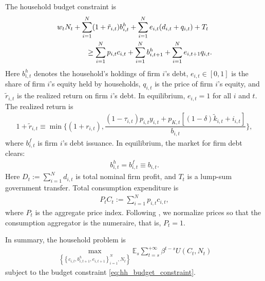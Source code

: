 \documentclass[12pt]{article}
\numberwithin{equation}{section}
\begin{document}
The household budget constraint is
\begin{align}\label{eq:hh_budget_constraint}
    &w_tN_t
    +\sum_{i=1}^{N}
        (1+\tilde{r}_{i,t})b^h_{i,t}
    +\sum_{i=1}^N e_{i,t} (d_{i,t} + q_{i,t}) + T_t \notag\\
    &\qquad \qquad\geq
    \sum_{i=1}^{N}
        p_{i,t}c_{i,t}
    +\sum_{i=1}^{N}b^h_{i,t+1} +\sum_{i=1}^N e_{i,t+1}  q_{i,t}.
\end{align}
Here $b^h_{i,t}$ denotes the household's holdings of firm $i$'s debt, $e_{i,t} \in [0,1]$ is the share of firm $i$'s equity held by households, $q_{i,t}$ is the price of firm $i$'s equity, and $\tilde{r}_{i,t}$ is the realized return on firm $i$'s debt. In equilibrium, $e_{i,t}=1$ for all $i$ and $t$. The realized return is
\begin{align}\label{eq:hh_realized_return}
    1+\tilde{r}_{i,t} \equiv
    \min\Bigg\{
        (1+r_{i,t}),
        \dfrac{(1-\tau_{i,t})p_{i,t} y_{i,t}
        +
        p_{K,t}
        \left[
            (1-\delta)\tilde{k}_{i,t}+i_{i,t}
        \right]}{b_{i,t}}
    \Bigg\},
\end{align}
where $b^f_{i,t}$ is firm $i$'s debt issuance. In equilibrium, the market for firm debt clears:
\begin{align}\label{eq:firm_debt_market_clearing}
    b^h_{i,t}=b^f_{i,t} \equiv b_{i,t}.
\end{align}
Here $D_t:= \sum_{i=1}^N d_{i,t}$ is total nominal firm profit, and $T_t$ is a lump-sum government transfer. Total consumption expenditure is
\begin{align*}
    P_tC_t
    :=
    \sum_{i=1}^{N}
        p_{i,t}c_{i,t},
\end{align*}
where $P_t$ is the aggregate price index. Following \cite{herskovicNetworksProductionAsset2018}, we normalize prices so that the consumption aggregator is the numeraire, that is, $P_t=1$.

In summary, the household problem is
\begin{align}\label{eq:hh_problem}
    \max_{\left\{\left\{c_{i,t}, b^h_{i,t+1}, e_{i,t+1}\right\}_{i=1}^{N}, N_t\right\}} \mathbb{E}_s \sum_{t=s}^{+\infty} \beta^{t-s} U(C_t, N_t)
\end{align}
subject to the budget constraint \eqref{eq:hh_budget_constraint}.
\end{document}
